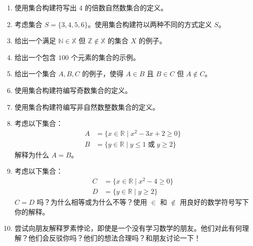 \begin{enumerate}[label=(\arabic*)]
    \item 使用集合构建符写出 $4$ 的倍数自然数集合的定义。
    \item 考虑集合 $S = \{3, 4, 5, 6\}$。使用集合构建符以两种不同的方式定义 $S$。
    \item 给出一个满足 $\mathbb{N} \in \mathbb{X}$ 但 $\mathbb{Z} \notin \mathbb{X}$ 的集合 $X$ 的例子。
    \item 给出一个包含 $100$ 个元素的集合的示例。
    \item 给出一个集合 $A, B, C$ 的例子，使得 $A \in B$ 且 $B \in C$ 但 $A \notin C$。
    \item 使用集合构建符编写奇数集合的定义。
    \item 使用集合构建符编写非自然数整数集合的定义。
    \item 考虑以下集合：
        \begin{align*}
            A &= \{x \in \mathbb{R} \mid x^2 - 3x + 2 \ge 0\} \\
            B &= \{y \in \mathbb{R} \mid y \le 1 \;\text{或}\; y \ge 2\}
        \end{align*}
        解释为什么 $A=B$。
    \item 考虑以下集合：
        \begin{align*}
            C &= \{x \in \mathbb{R} \mid x^2 - 4 \ge 0\} \\
            D &= \{y \in \mathbb{R} \mid y \ge 2\}
        \end{align*}
        $C = D$ 吗？为什么相等或为什么不等？使用 $\in$ 和 $\notin$ 用良好的数学符号写下你的解释。
    \item 尝试向朋友解释罗素悖论，即使是一个没有学习数学的朋友。他们对此有何理解？他们会反驳你吗？他们的想法合理吗？和朋友讨论一下！
\end{enumerate}